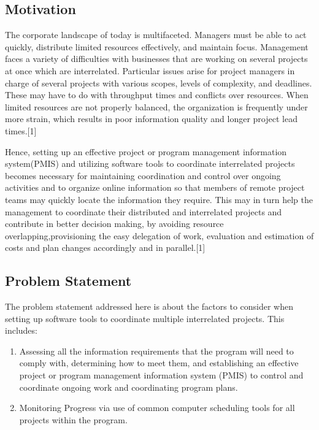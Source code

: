 \documentclass[runningheads]{llncs}
\begin{document}
\subsection{Motivation}
The corporate landscape of today is multifaceted. Managers must be able to act quickly, distribute limited resources effectively, and maintain focus. Management faces a variety of difficulties with businesses that are working on several projects at once which are interrelated. Particular issues arise for project managers in charge of several projects with various scopes, levels of complexity, and deadlines. These may have to do with throughput times and conflicts over resources. When limited resources are not properly balanced, the organization is frequently under more strain, which results in poor information quality and longer project lead times.[1]

Hence, setting up an effective project or program management information system(PMIS) and utilizing software tools to coordinate interrelated projects becomes necessary for maintaining coordination and control over ongoing activities and to organize online information so that members of remote project teams may quickly locate the information they require. This may in turn help the management to coordinate their distributed and interrelated projects and contribute in better decision making, by avoiding resource overlapping,provisioning the easy delegation of work, evaluation and estimation of costs and plan changes accordingly and in parallel.[1]
\subsection{Problem Statement}

The problem statement addressed here is about the factors to consider when setting up software tools to coordinate multiple interrelated projects. This includes:
\begin{enumerate}
  \item Assessing all the information requirements that the program will need to comply with, determining how to meet them, and establishing an effective project or program management information system (PMIS) to control and coordinate ongoing work and coordinating program plans.

 \item Monitoring Progress via use of common computer scheduling tools for all projects within the program.

\end{enumerate}
\end{document}
